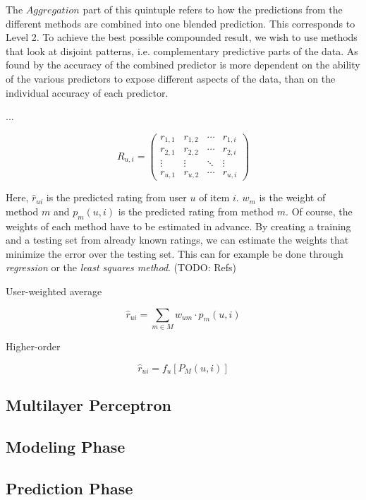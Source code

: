 The $Aggregation$ part of this quintuple refers to how the predictions from the different methods are combined
into one blended prediction. 
This corresponds to Level 2.
To achieve the best possible compounded result, we wish to use methods that look at disjoint patterns, 
i.e. complementary predictive parts of the data.
As found by \citet[p6]{Bell2007} the accuracy of the combined predictor is more dependent on the 
ability of the various predictors to expose different aspects of the data, than on 
the individual accuracy of each predictor.


...


\begin{equation*}
 R_{u,i} =
 \begin{pmatrix}
  r_{1,1} & r_{1,2} & \cdots & r_{1,i} \\
  r_{2,1} & r_{2,2} & \cdots & r_{2,i} \\
  \vdots  & \vdots  & \ddots & \vdots  \\
  r_{u,1} & r_{u,2} & \cdots & r_{u,i}
 \end{pmatrix}
\end{equation*}

Here, $\hat{r}_{ui}$ is the predicted rating from user $u$ of item $i$.
$w_m$ is the weight of method $m$ and $p_m(u,i)$ is the predicted rating from method $m$.
Of course, the weights of each method have to be estimated in advance.
By creating a training and a testing set from already known ratings, we can estimate the weights
that minimize the error over the testing set. 
This can for example be done through \emph{regression} or the \emph{least squares method}.
(TODO: Refs)

User-weighted average

\begin{equation*}
  \hat{r}_{ui} = \sum_{m \in M} w_{um} \cdot p_m(u,i)
\end{equation*}


Higher-order

\begin{equation*}
  \hat{r}_{ui} = f_{u}[ P_{M}(u,i) ]
\end{equation*}


\subsection{Multilayer Perceptron}
\subsection{Modeling Phase}
\subsection{Prediction Phase}





